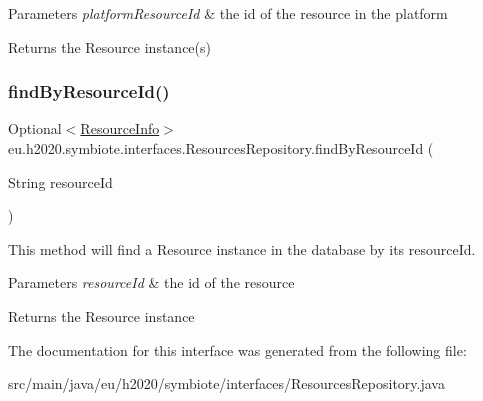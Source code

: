 \begin{DoxyParams}{Parameters}
{\em platform\+Resource\+Id} & the id of the resource in the platform \\
\hline
\end{DoxyParams}
\begin{DoxyReturn}{Returns}
the Resource instance(s) 
\end{DoxyReturn}
\mbox{\label{interfaceeu_1_1h2020_1_1symbiote_1_1interfaces_1_1ResourcesRepository_a8dbe7b5a525d899cb06a669e3bec3c36}} 
\subsubsection{\texorpdfstring{find\+By\+Resource\+Id()}{findByResourceId()}}
{\footnotesize\ttfamily Optional$<$\hyperlink{classeu_1_1h2020_1_1symbiote_1_1resources_1_1ResourceInfo}{Resource\+Info}$>$ eu.\+h2020.\+symbiote.\+interfaces.\+Resources\+Repository.\+find\+By\+Resource\+Id (\begin{DoxyParamCaption}\item[{String}]{resource\+Id }\end{DoxyParamCaption})}

This method will find a Resource instance in the database by its resource\+Id.


\begin{DoxyParams}{Parameters}
{\em resource\+Id} & the id of the resource \\
\hline
\end{DoxyParams}
\begin{DoxyReturn}{Returns}
the Resource instance 
\end{DoxyReturn}


The documentation for this interface was generated from the following file\+:\begin{DoxyCompactItemize}
\item 
src/main/java/eu/h2020/symbiote/interfaces/Resources\+Repository.\+java\end{DoxyCompactItemize}

